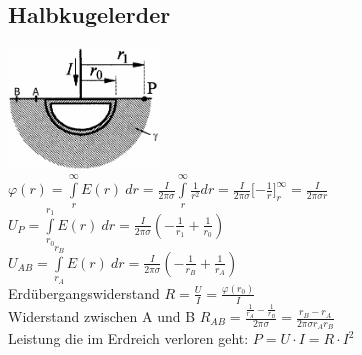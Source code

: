 \subsection{Halbkugelerder}
\begin{multicols}{2}
\includegraphics[width=0.3\textwidth]{pics/stroemungsfeld/halbkugelerder}\\
$ \varphi (r) = \int\limits_r^{\infty} E(r)\ dr = \frac{I}{2 \pi \sigma} \int\limits_r^{\infty} \frac{1}{r^2} dr = \frac{I}{2 \pi \sigma} \lbrack - \frac{1}{r} \rbrack_r^{\infty} = \frac{I}{2 \pi \sigma r}$ \\
$ U_P = \int\limits_{r_0}^{r_1} E(r)\ dr = \frac{I}{2 \pi \sigma}(-\frac{1}{r_1} + \frac{1}{r_0}) $\\
$ U_{AB} = \int\limits_{r_A}^{r_B} E(r)\ dr = \frac{I}{2 \pi \sigma}(-\frac{1}{r_B} + \frac{1}{r_A}) $ \\
Erdübergangswiderstand $ R = \frac{U}{I} = \frac{\varphi(r_0)}{I} $ \\[5pt]
Widerstand zwischen A und B $ R_{AB} =  \frac{\frac{1}{r_A} - \frac{1}{r_B}}{2 \pi \sigma}= \frac{r_B - r_A}{2 \pi \sigma r_A r_B} $ \\[5pt]
Leistung die im Erdreich verloren geht: $ P = U \cdot I = R \cdot I^2$ \\
\end{multicols}

